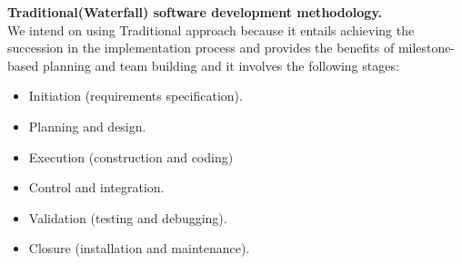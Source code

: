 
\textbf{ \large Traditional(Waterfall) software development methodology.}
\newline \\  We intend on using Traditional approach because it entails achieving the succession in the implementation process and provides the benefits of milestone-based planning and team building and it involves the following stages:
\begin{itemize}
        \item Initiation (requirements specification).
        \item Planning and design.
        \item Execution (construction and coding)
        \item Control and integration.
        \item Validation (testing and debugging).
        \item Closure (installation and maintenance).
\end{itemize}
